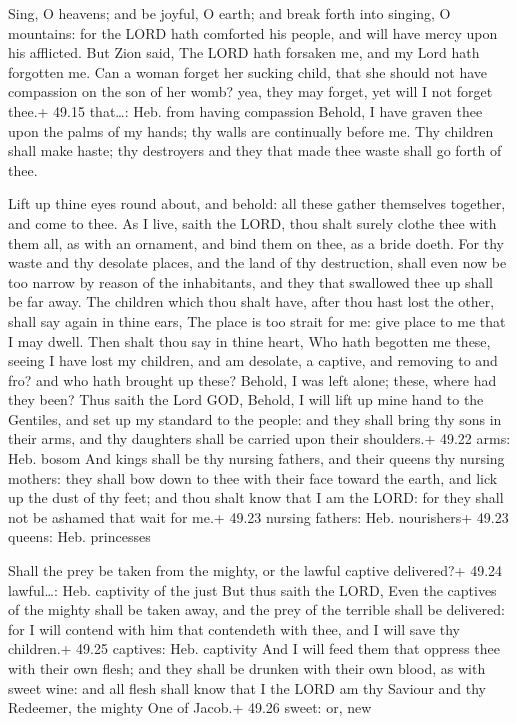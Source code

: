  Sing, O heavens; and be joyful, O earth; and break forth
into singing, O mountains: for the LORD hath comforted his people, and
will have mercy upon his afflicted.  But Zion said, The
LORD hath forsaken me, and my Lord hath forgotten me.  Can
a woman forget her sucking child, that she should not have compassion on
the son of her womb? yea, they may forget, yet will I not forget thee.+
49.15 that\ldots: Heb. from having compassion  Behold, I
have graven thee upon the palms of my hands; thy walls are continually
before me.  Thy children shall make haste; thy destroyers
and they that made thee waste shall go forth of thee.

 Lift up thine eyes round about, and behold: all these
gather themselves together, and come to thee. As I live, saith the LORD,
thou shalt surely clothe thee with them all, as with an ornament, and
bind them on thee, as a bride doeth.  For thy waste and thy
desolate places, and the land of thy destruction, shall even now be too
narrow by reason of the inhabitants, and they that swallowed thee up
shall be far away.  The children which thou shalt have,
after thou hast lost the other, shall say again in thine ears, The place
is too strait for me: give place to me that I may dwell. 
Then shalt thou say in thine heart, Who hath begotten me these, seeing I
have lost my children, and am desolate, a captive, and removing to and
fro? and who hath brought up these? Behold, I was left alone; these,
where had they been?  Thus saith the Lord GOD, Behold, I
will lift up mine hand to the Gentiles, and set up my standard to the
people: and they shall bring thy sons in their arms, and thy daughters
shall be carried upon their shoulders.+ 49.22 arms: Heb. bosom
 And kings shall be thy nursing fathers, and their queens
thy nursing mothers: they shall bow down to thee with their face toward
the earth, and lick up the dust of thy feet; and thou shalt know that I
am the LORD: for they shall not be ashamed that wait for me.+ 49.23
nursing fathers: Heb. nourishers+ 49.23 queens: Heb. princesses

 Shall the prey be taken from the mighty, or the lawful
captive delivered?+ 49.24 lawful\ldots: Heb. captivity of the just
 But thus saith the LORD, Even the captives of the mighty
shall be taken away, and the prey of the terrible shall be delivered:
for I will contend with him that contendeth with thee, and I will save
thy children.+ 49.25 captives: Heb. captivity  And I will
feed them that oppress thee with their own flesh; and they shall be
drunken with their own blood, as with sweet wine: and all flesh shall
know that I the LORD am thy Saviour and thy Redeemer, the mighty One of
Jacob.+ 49.26 sweet: or, new

